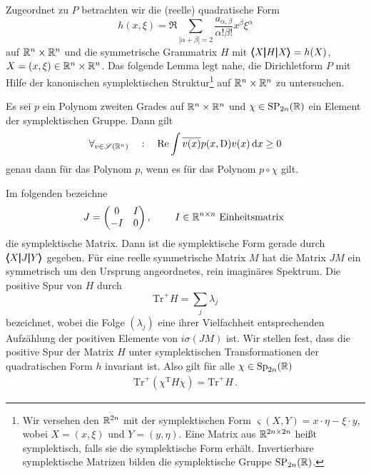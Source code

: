 Zugeordnet zu $P$ betrachten wir die (reelle) quadratische Form
\begin{equation}
  h(x,\xi) = \Re  \sum_{|\alpha+\beta|= 2} \frac{a_{\alpha,\beta}}{\alpha!\beta!} x^\beta\xi^\alpha
\end{equation}
auf $\mathbb R^n\times\mathbb R^n$ und die symmetrische Grammatrix $H$ mit $\pmb\langle X\pmb|H\pmb|X\pmb\rangle=h(X)$, $X=(x,\xi)\in\mathbb R^n\times\mathbb R^n$.  Das folgende Lemma legt nahe, die Dirichletform $P$ mit Hilfe der kanonischen symplektischen Struktur\footnote{Wir versehen den $\mathbb R^{2n}$ mit der symplektischen Form
$\varsigma(X,Y) = x\cdot \eta - \xi\cdot y$, wobei $X=(x,\xi)$ und $Y=(y,\eta)$. Eine Matrix aus $\mathbb R^{2n\times 2n}$ heißt symplektisch, falls sie die symplektische Form erhält. Invertierbare symplektische Matrizen bilden die symplektische Gruppe $\mathrm{SP}_{2n}(\mathbb R)$.} auf $\mathbb R^n\times\mathbb R^n$ zu untersuchen.
\begin{lem}
Es sei $p$ ein Polynom zweiten Grades auf $\mathbb R^n\times\mathbb R^n$ und $\chi\in\mathrm{SP}_{2n}(\mathbb R)$ ein Element der symplektischen Gruppe. Dann gilt
\begin{align}
\forall_{v\in\mathscr S(\mathbb R^n)} \quad:\quad \operatorname{Re} \int \overline{v(x)}p(x,\mathrm D)v(x)\,\mathrm d x\ge 0
\end{align}
genau dann für das Polynom $p$, wenn es für das Polynom $p\circ \chi$ gilt.
\end{lem}
Im folgenden bezeichne
\begin{align}
J=\begin{pmatrix}
0 & I\\
-I& 0 
\end{pmatrix},\qquad\text{ $ I \in\mathbb R^{n\times n}$  Einheitsmatrix }
\end{align}
die symplektische Matrix. Dann ist die symplektische Form gerade durch $\pmb\langle X\pmb|J\pmb|Y\pmb\rangle$ gegeben. Für eine reelle symmetrische Matrix $M$ hat  die Matrix $JM$ ein symmetrisch um den Ursprung angeordnetes, rein imaginäres Spektrum. Die positive Spur von $H$ durch
\begin{equation}
   {\mathrm{Tr}}^+ H = \sum_j\lambda_j 
\end{equation}
bezeichnet, wobei die Folge $(\lambda_j)$ eine ihrer Vielfachheit entsprechenden Aufzählung der positiven Elemente von $i\sigma(JM)$ ist. Wir stellen fest, dass die positive Spur
der Matrix $H$ unter symplektischen Transformationen der quadratischen Form $h$ invariant ist. Also gilt für alle $\chi\in\mathrm{Sp}_{2n}(\mathbb R)$
\begin{align*}
\mathrm{Tr}^+(\chi^\mathrm{T}H\chi) = \mathrm{Tr}^+ H\,.
\end{align*}

